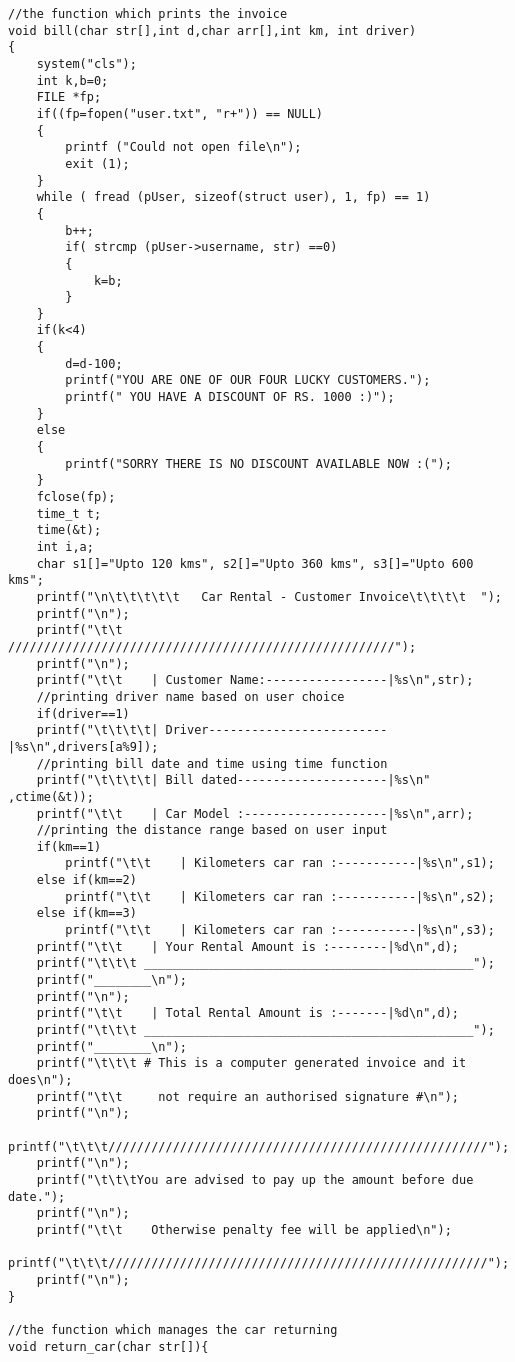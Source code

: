 \documentclass[12pt]{article}
\begin{document}
\begin{lstlisting}
//the function which prints the invoice
void bill(char str[],int d,char arr[],int km, int driver)
{
    system("cls");
    int k,b=0;
    FILE *fp;
    if((fp=fopen("user.txt", "r+")) == NULL)
    {
        printf ("Could not open file\n");
        exit (1);
    }
    while ( fread (pUser, sizeof(struct user), 1, fp) == 1)
    {
        b++;
        if( strcmp (pUser->username, str) ==0)
        {
            k=b;
        }
    }
    if(k<4)
    {
        d=d-100;
        printf("YOU ARE ONE OF OUR FOUR LUCKY CUSTOMERS.");
        printf(" YOU HAVE A DISCOUNT OF RS. 1000 :)");
    }
    else
    {
        printf("SORRY THERE IS NO DISCOUNT AVAILABLE NOW :(");
    }
    fclose(fp);
    time_t t;
    time(&t);
    int i,a;
    char s1[]="Upto 120 kms", s2[]="Upto 360 kms", s3[]="Upto 600 kms";
    printf("\n\t\t\t\t\t   Car Rental - Customer Invoice\t\t\t\t  ");
    printf("\n");
    printf("\t\t  //////////////////////////////////////////////////////");
    printf("\n");
    printf("\t\t    | Customer Name:-----------------|%s\n",str);
    //printing driver name based on user choice
    if(driver==1)
    printf("\t\t\t\t| Driver-------------------------|%s\n",drivers[a%9]);
    //printing bill date and time using time function
    printf("\t\t\t\t| Bill dated---------------------|%s\n" ,ctime(&t));
    printf("\t\t    | Car Model :--------------------|%s\n",arr);
    //printing the distance range based on user input
    if(km==1)
        printf("\t\t    | Kilometers car ran :-----------|%s\n",s1);
    else if(km==2)
        printf("\t\t    | Kilometers car ran :-----------|%s\n",s2);
    else if(km==3)
        printf("\t\t    | Kilometers car ran :-----------|%s\n",s3);
    printf("\t\t    | Your Rental Amount is :--------|%d\n",d);
    printf("\t\t\t ______________________________________________");
    printf("________\n");
    printf("\n");
    printf("\t\t    | Total Rental Amount is :-------|%d\n",d);
    printf("\t\t\t ______________________________________________");
    printf("________\n");
    printf("\t\t\t # This is a computer generated invoice and it does\n");
    printf("\t\t     not require an authorised signature #\n");
    printf("\n");
    printf("\t\t\t/////////////////////////////////////////////////////");
    printf("\n");
    printf("\t\t\tYou are advised to pay up the amount before due date.");
    printf("\n");
    printf("\t\t    Otherwise penalty fee will be applied\n");
    printf("\t\t\t/////////////////////////////////////////////////////");
    printf("\n");
}

//the function which manages the car returning
void return_car(char str[]){


\end{lstlisting}
\end{document}
